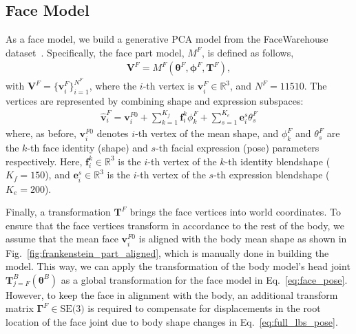 \subsection{Face Model}
\label{subsection:face}
As a face model, we build a generative PCA model from the FaceWarehouse dataset~\cite{cao2014facewarehouse}. Specifically, the face part model, $M^F$, is defined as follows,
\begin{align}
\mathbf{V}^F = M^F (\boldsymbol{\theta}^F, \boldsymbol{\phi}^F, \mathbf{T}^F ),
\end{align}
with $\mathbf{V}^F = \{ \mathbf{v}^F_i\}_{i=1}^{N^F}$, where the $i$-th vertex is $\mathbf{v}^F_i\in\mathds{R}^3$, and $N^F{=}11510$. The vertices are represented by combining shape and expression subspaces:
\begin{align}
\hat{\mathbf{v}}_i^F = \mathbf{v}^{F0}_i + \sum_{k=1}^{K_{f}} \mathbf{f}^k_{i} \phi^F_k  + \sum_{s=1}^{K_{e}} \mathbf{e}^s_{i} \theta^F_s
\label{eq:face_shape}
\end{align}
where, as before, $\mathbf{v}^{F0}_i$ denotes $i$-th vertex of the mean shape, and $\phi^F_k$ and $\theta^F_s$ are the $k$-th face identity (shape) and $s$-th facial expression (pose) parameters respectively. Here, $\mathbf{f}^k_i\in\mathds{R}^3$ is the $i$-th vertex of the $k$-th identity blendshape ($K_{f}=150$), and $\mathbf{e}^s_i\in\mathds{R}^3$ is the $i$-th vertex of the $s$-th expression blendshape ($K_{e}=200$). 

Finally, a transformation $\mathbf{T}^F$ brings the face vertices into world coordinates. To ensure that the face vertices transform in accordance to the rest of the body, we assume that the mean face $\mathbf{v}^{F0}_i$ is aligned with the body mean shape as shown in Fig.~\ref{fig:frankenstein_part_aligned}, which is manually done in building the model. This way, we can apply the transformation of the body model's head joint $\mathbf{T}^B_{j=F}(\boldsymbol{\theta}^B)$ as a global transformation for the face model in Eq.~\ref{eq:face_pose}. However, to keep the face in alignment with the body, an additional transform matrix $\bm{\Gamma}^F \in \textrm{SE(3)}$ is required to compensate for displacements in the root location of the face joint due to body shape changes in Eq.~\ref{eq:full_lbs_pose}. 

